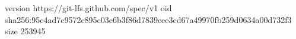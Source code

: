 version https://git-lfs.github.com/spec/v1
oid sha256:95c4ad7c9572c895c03e6b3f86d7839eee3cd67a49970fb259d0634a00d732f3
size 253945
